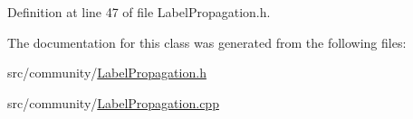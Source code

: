 Definition at line 47 of file Label\-Propagation.\-h.



The documentation for this class was generated from the following files\-:\begin{DoxyCompactItemize}
\item 
src/community/\hyperlink{_label_propagation_8h}{Label\-Propagation.\-h}\item 
src/community/\hyperlink{_label_propagation_8cpp}{Label\-Propagation.\-cpp}\end{DoxyCompactItemize}
